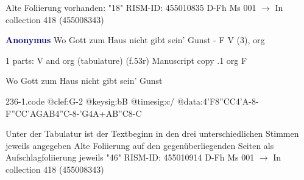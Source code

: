 \documentclass[twocolumn]{book}
\begin{document}
\newline Alte Foliierung vorhanden: "18"
\newline RISM-ID: 455010835
\newline D-Fh  Ms 001
\newline $\rightarrow$ In collection 418 (455008343)
      
\newline \par \vspace{7pt} \textcolor{darkblue}{\textbf{Anonymus  }}
\newline Wo Gott zum Haus nicht gibt sein' Gunst - F
\newline V (3), org
\newline \begin{itshape}\end{itshape} 
\newline \textcolor{darkblue}{}  1 parts: V and org (tabulature)  (f.53r)
\newline Manuscript copy
.1  org  F
\newline \begin{footnotesize} Wo Gott zum Haus nicht gibt sein' Gunst \end{footnotesize}  
\begin{filecontents*}{236-1.code}
@clef:G-2
@keysig:bB
@timesig:c/
@data:4'F{8''CC}4'A-8-F{''CC}{'AGAB}4''C-8-'G4A+AB''C8-C
\end{filecontents*}
\newline
%

\newline Unter der Tabulatur ist der Textbeginn in den drei unterschiedlichen Stimmen jeweils angegeben
\newline Alte Foliierung auf den gegenüberliegenden Seiten als Aufschlagfoliierung jeweils "46"
\newline RISM-ID: 455010914
\newline D-Fh  Ms 001
\newline $\rightarrow$ In collection 418 (455008343)
      
\end{document}
